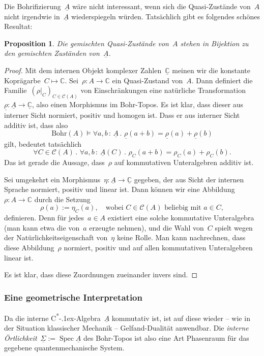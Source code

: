 \documentclass[a4paper,ngerman,12pt]{scrartcl}
\theoremstyle{definition}
\theoremstyle{plain}
\newtheorem{prop}[defn]{Proposition}
\theoremstyle{remark}
\newcommand{\CC}{\mathbb{C}}
\newcommand{\C}{\mathcal{C}}
\newcommand{\Bohr}{\mathrm{Bohr}}
\newcommand{\ul}[1]{\underline{#1}}
\newcommand{\csalgebra}{C\textsuperscript{*}\kern-.1ex-Algebra}
\DeclareMathOperator{\Spec}{Spec}
\renewcommand{\_}{\mathpunct{.}\,}
\newcommand{\?}{\,{:}\,}
\begin{document}
Die Bohrifizierung~$\ul{A}$ wäre nicht interessant, wenn sich die Quasi-Zustände
von~$A$ nicht irgendwie in~$\ul{A}$ wiederspiegeln würden. Tatsächlich gibt es
folgendes schönes Resultat:

\begin{prop}Die gemischten Quasi-Zustände von~$A$ stehen in Bijektion zu den
gemischten Zuständen von~$\ul{A}$.\end{prop}
\begin{proof}Mit dem internen Objekt komplexer Zahlen~$\ul{\CC}$ meinen wir die
konstante Koprägarbe~$C \mapsto \CC$. Sei~$\rho : A \to \CC$ ein Quasi-Zustand
von~$A$. Dann definiert die Familie~$(\rho|_C)_{C \in \C(A)}$ von
Einschränkungen eine natürliche Transformation~$\ul{\rho} : \ul{A} \to
\ul{\CC}$, also einen Morphismus im Bohr-Topos. Es ist klar, dass dieser aus
interner Sicht normiert, positiv und homogen ist. Dass er aus interner Sicht
additiv ist, dass also
\[ \Bohr(A) \models \forall a,b\?\ul{A}\_ \ul{\rho}(a+b) = \ul{\rho}(a) +
\ul{\rho}(b) \]
gilt, bedeutet tatsächlich
\[ \forall C \in \C(A)\_ \forall a,b\?\ul{A}(C)\_ \rho_C(a+b) = \rho_C(a) +
\rho_C(b). \]
Das ist gerade die Aussage, dass~$\rho$ auf kommutativen Unteralgebren additiv
ist.

Sei umgekehrt ein Morphismus~$\eta : \ul{A} \to \ul{\CC}$ gegeben, der aus
Sicht der internen Sprache normiert, positiv und linear ist. Dann können wir
eine Abbildung~$\rho : A \to \CC$ durch die Setzung
\[ \rho(a) := \eta_C(a), \quad\text{wobei~$C \in \C(A)$ beliebig mit~$a \in
C$}, \]
definieren. Denn für jedes~$a \in A$ existiert eine solche kommutative Unteralgebra (man kann
etwa die von~$a$ erzeugte nehmen), und die Wahl von~$C$ spielt wegen der
Natürlichkeitseigenschaft von~$\eta$ keine Rolle. Man kann nachrechnen, dass
diese Abbildung~$\rho$ normiert, positiv und auf allen kommutativen
Unteralgebren linear ist.

Es ist klar, dass diese Zuordnungen zueinander invers sind.\end{proof}


\subsubsection*{Eine geometrische Interpretation}

Da die interne \csalgebra~$\ul{A}$ kommutativ ist, ist auf diese wieder -- wie
in der Situation klassischer Mechanik -- Gelfand-Dualität anwendbar. Die
\emph{interne Örtlichkeit}~$\ul{\Sigma} := \Spec \ul{A}$ des Bohr-Topos ist
also eine Art Phasenraum für das gegebene quantenmechanische System.
\end{document}
